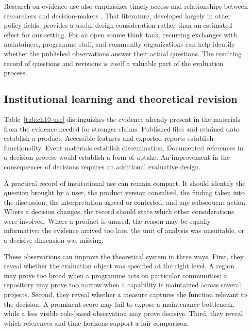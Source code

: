 Research on evidence use also emphasizes timely access and relationships between researchers and decision-makers \citep{oliver2014}. That literature, developed largely in other policy fields, provides a useful design consideration rather than an estimated effect for our setting. For an open source think tank, recurring exchanges with maintainers, programme staff, and community organizations can help identify whether the published observations answer their actual questions. The resulting record of questions and revisions is itself a valuable part of the evaluation process.

\subsection{Institutional learning and theoretical revision}
Table~\ref{tab:ch10-use} distinguishes the evidence already present in the materials from the evidence needed for stronger claims. Published files and retained data establish a product. Accessible features and exported reports establish functionality. Event materials establish dissemination. Documented references in a decision process would establish a form of uptake. An improvement in the consequences of decisions requires an additional evaluative design.



A practical record of institutional use can remain compact. It should identify the question brought by a user, the product version consulted, the finding taken into the discussion, the interpretation agreed or contested, and any subsequent action. Where a decision changes, the record should state which other considerations were involved. Where a product is unused, the reason may be equally informative: the evidence arrived too late, the unit of analysis was unsuitable, or a decisive dimension was missing.

These observations can improve the theoretical system in three ways. First, they reveal whether the evaluation object was specified at the right level. A region may prove too broad when a programme acts on particular communities; a repository may prove too narrow when a capability is maintained across several projects. Second, they reveal whether a measure captures the function relevant to the decision. A prominent score may fail to expose a maintenance bottleneck, while a less visible role-based observation may prove decisive. Third, they reveal which references and time horizons support a fair comparison.

